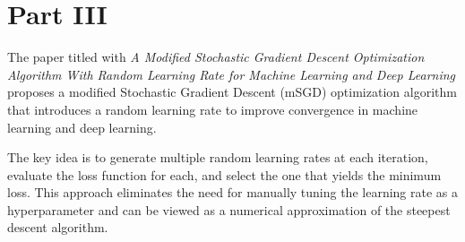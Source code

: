 \documentclass[12pt]{article}
\begin{document}
\vspace{0.5cm}

\section{Part III}

\begingroup

\setlength{\parindent}{0pt}
\setlength{\parskip}{0.8em}

The paper titled with \textit{A Modified Stochastic Gradient Descent Optimization Algorithm With Random Learning Rate for Machine Learning and Deep Learning} proposes a modified Stochastic Gradient Descent (mSGD) optimization algorithm that introduces a random learning rate to improve convergence in machine learning and deep learning.

The key idea is to generate multiple random learning rates at each iteration, evaluate the loss function for each, and select the one that yields the minimum loss. This approach eliminates the need for manually tuning the learning rate as a hyperparameter and can be viewed as a numerical approximation of the steepest descent algorithm.

\endgroup
\end{document}
